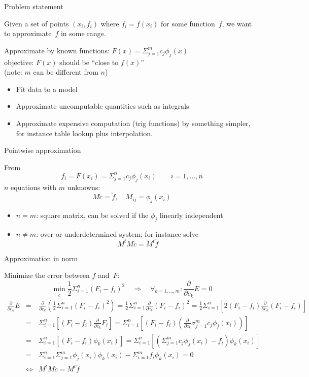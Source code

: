  {Problem statement} 

  Given a set of points $(x_i,f_i)$ where $f_i=f(x_i)$ for some
  function~$f$, we want to approximate~$f$ in some range.

  Approximate by known functions: $F(x)=\Sigma_{j=1}^mc_j\phi_j(x)$\\
  objective: $F(x)$ should be ``close to $f(x)$''\\
  (note: $m$ can be different from $n$)

  \begin{itemize}
  \item Fit data to a model
  \item Approximate uncomputable quantities such as integrals
  \item Approximate expensive computation (trig functions) by
    something simpler, for instance table lookup plus interpolation.
  \end{itemize}

 {Pointwise approximation}

  From \[ f_i=F(x_i)=\Sigma_{j=1}^nc_j\phi_j(x_i) \qquad i=1,\ldots,n \]
  $n$ equations with $m$ unknowns:
  \[ M \utilde c = \utilde f,\quad M_{ij}=\phi_j(x_i) \]

  \begin{itemize}
  \item $n=m$: square matrix, can be solved if the $\phi_j$ linearly independent
  \item $n\not=m$: over or underdetermined system; for instance solve
    \[ M^tM \utilde c = M^t \utilde f \]
  \end{itemize}

 {Approximation in norm}

  Minimize the error between $f$ and~$F$:
  \[ \min_{\utilde c} \frac12 \Sigma_{i=1}^n (F_i-f_i)^2 \quad\Rightarrow\quad
  \forall_{k=1,\ldots,m}\colon \frac\partial{\partial c_k}E=0
  \]
  \def\pck{\frac\partial{\partial c_k}}
  \begin{eqnarray*}
    \pck E&=&\pck \left(\frac12\Sigma_{i=1}^n(F_i-f_i)^2\right)
    = \frac12 \Sigma_{i=1}^n \pck (F_i-f_i)^2
    = \frac12 \Sigma_{i=1}^n \left[2(F_i-f_i)\pck (F_i-f_i)\right ]\\
    &=&\Sigma_{i=1}^n\left[(F_i-f_i)\pck F_i\right]
    = \Sigma_{i=1}^n\left[ (F_i-f_i)\left(
        \pck \sigma_{j=1}^m c_j\phi_j(x_i) \right) \right ]\\
    &=& \Sigma_{i=1}^n[(F_i-f_i)\phi_k(x_i)]
    = \Sigma_{i=1}^n\left[ \left( \Sigma_{j=1}^m c_j\phi_j(x_i)-f_i \right)
      \phi_k(x_i) \right]\\
    &=& \Sigma_{i=1}^n\Sigma_{j=1}^m \phi_j(x_i)\phi_k(x_i)
    - \Sigma_{i=1}^m f_i\phi_k(x_i) = 0\\
    &\Leftrightarrow&M^tM\utilde c=M^t\utilde f
  \end{eqnarray*}

